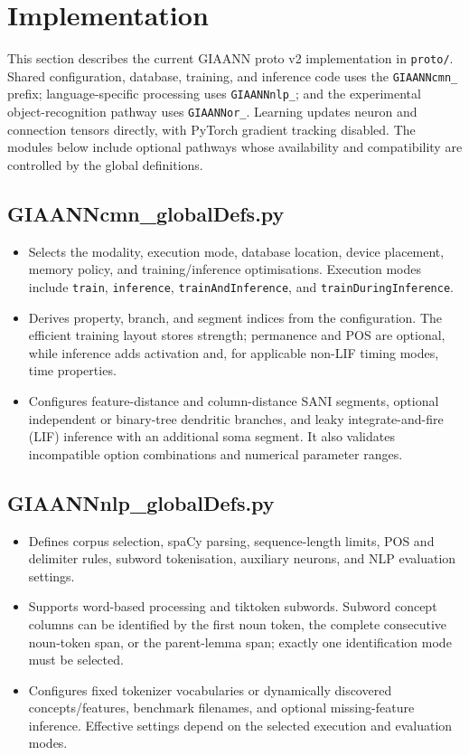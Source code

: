 \section{Implementation}

This section describes the current GIAANN proto v2 implementation in \texttt{proto/}. Shared configuration, database, training, and inference code uses the \texttt{GIAANNcmn\_} prefix; language-specific processing uses \texttt{GIAANNnlp\_}; and the experimental object-recognition pathway uses \texttt{GIAANNor\_}. Learning updates neuron and connection tensors directly, with PyTorch gradient tracking disabled. The modules below include optional pathways whose availability and compatibility are controlled by the global definitions.

\subsection{GIAANNcmn\_globalDefs.py}
\begin{itemize}
	\item Selects the modality, execution mode, database location, device placement, memory policy, and training/inference optimisations. Execution modes include \texttt{train}, \texttt{inference}, \texttt{trainAndInference}, and \texttt{trainDuringInference}.
	\item Derives property, branch, and segment indices from the configuration. The efficient training layout stores strength; permanence and POS are optional, while inference adds activation and, for applicable non-LIF timing modes, time properties.
	\item Configures feature-distance and column-distance SANI segments, optional independent or binary-tree dendritic branches, and leaky integrate-and-fire (LIF) inference with an additional soma segment. It also validates incompatible option combinations and numerical parameter ranges.
\end{itemize}

\subsection{GIAANNnlp\_globalDefs.py}
\begin{itemize}
	\item Defines corpus selection, spaCy parsing, sequence-length limits, POS and delimiter rules, subword tokenisation, auxiliary neurons, and NLP evaluation settings.
	\item Supports word-based processing and tiktoken subwords. Subword concept columns can be identified by the first noun token, the complete consecutive noun-token span, or the parent-lemma span; exactly one identification mode must be selected.
	\item Configures fixed tokenizer vocabularies or dynamically discovered concepts/features, benchmark filenames, and optional missing-feature inference. Effective settings depend on the selected execution and evaluation modes.
\end{itemize}

